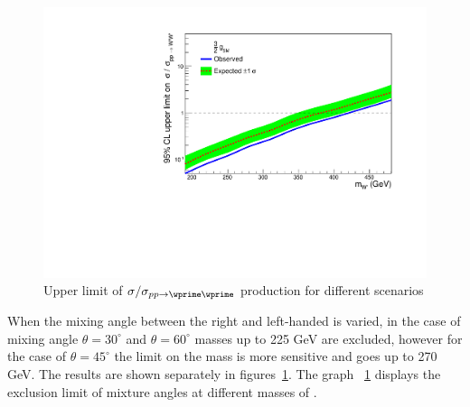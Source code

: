 \begin{figure}[!htb]
  \hspace{3mm}
  \includegraphics*[width=.45\textwidth]{figs/mix3Over2b.pdf}
  \caption{Upper limit of $\sigma/\sigma_{pp \rightarrow \wprime \wprime}$ production for different scenarios}
  \label{fig:brazilianFlags}
\end{figure}

When the mixing angle between the right and left-handed \wprime is varied, in the case of mixing angle $\theta=30^\circ$ and $\theta=60^\circ$ masses up to 225 GeV are excluded, however for the case of $\theta=45^\circ$ the limit on the mass is more sensitive and goes up to 270 GeV. The results are shown separately in figures~\ref{fig:brazilianFlags}. The graph ~\ref{fig:brazilianFlags} displays the exclusion limit of mixture angles at different masses of \wprime.

 
